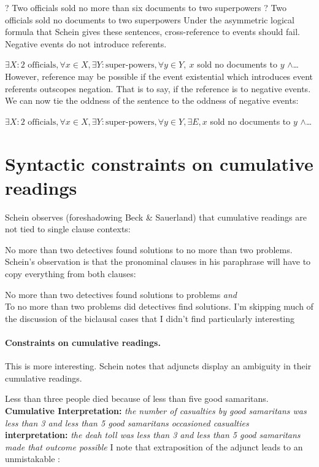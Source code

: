 \documentclass[english]{article}
\newcommand{\fg}{\color{darkred}}
\newcommand{\bg}{\color{blueish}}
\begin{document}
\pex
\a 
\ljudge? {\fg Two officials} sold {\bg no more than six documents} to {\fg two superpowers}
\a 
\ljudge? {\fg Two officials} sold {\bg no documents} to {\fg two superpowers}
\xe
%
Under the asymmetric logical formula that Schein gives these sentences, cross-reference to events should fail. Negative events do not introduce referents.

\ex
$\exists X : 2\text{ officials}, \forall x\in X, \exists Y : \text{super-powers}, \forall y\in Y,\ x$ sold no documents to $y$ $\wedge$\ldots
\xe
%
However, reference may be possible if the event existential which introduces event referents outscopes negation. That is to say, if the reference is to negative events. We can now tie the oddness of the sentence to the oddness of negative events:

\ex
$\exists X : 2\text{ officials}, \forall x\in X, \exists Y : \text{super-powers}, \forall y\in Y, \exists E, x$ sold no documents to $y$ $\wedge$\ldots
\xe
%


\section{Syntactic constraints on cumulative readings}

Schein observes (foreshadowing Beck \& Sauerland) that cumulative readings are not tied to single clause contexts:

\ex
No more than two detectives found solutions to no more than two problems.
\xe
%
Schein's observation is that the pronominal clauses in his paraphrase will have to copy everything from both clauses:

\ex
No more than two detectives found solutions to problems \emph{and}\\
To no more than two problems did detectives find solutions.
\xe
%
I'm skipping much of the discussion of the biclausal cases that I didn't find particularly interesting

\paragraph{Constraints on cumulative readings.}
This is more interesting. Schein notes that adjuncts display an ambiguity in their cumulative readings.

\pex
Less than three people died because of less than five good samaritans.
\a 
\textbf{Cumulative Interpretation:} \emph{the number of casualties by good samaritans was less than 3 and less than 5 good samaritans occasioned casualties}
\a 
\textbf{ interpretation:} \emph{the deah toll was less than 3 and less than 5 good samaritans made that outcome possible}
\xe
%
I note that extraposition of the adjunct leads to an unmistakable :
\end{document}
